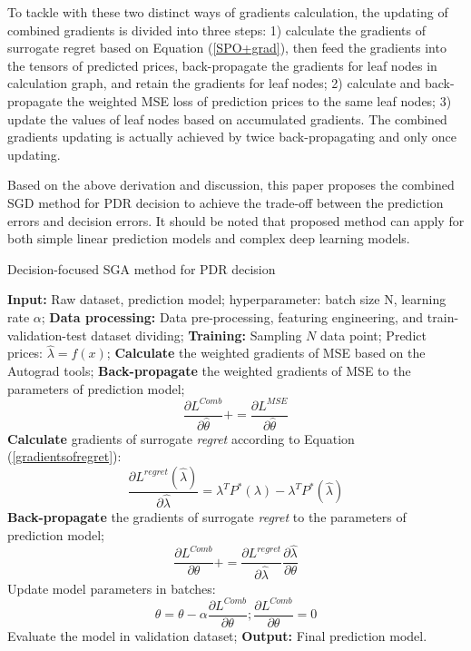 \documentclass[journal]{IEEEtran}
\begin{document}
To tackle with these two distinct ways of gradients calculation, the updating of combined gradients is divided into three steps: 1) calculate the gradients of surrogate regret based on Equation (\ref{SPO+grad}), then feed the gradients into the tensors of predicted prices, back-propagate the gradients for leaf nodes in calculation graph, and retain the gradients for leaf nodes; 2) calculate and back-propagate the weighted MSE loss of prediction prices to the same leaf nodes; 3) update the values of leaf nodes based on accumulated gradients. The combined gradients updating is actually achieved by twice back-propagating and only once updating.

Based on the above derivation and discussion, this paper proposes the combined SGD method for PDR decision to achieve the trade-off between the prediction errors and decision errors. It should be noted that proposed method can apply for both simple linear prediction models and complex deep learning models.

\begin{algorithm}[!t]
  \label{CombSGD}
  \caption{Decision-focused SGA method for PDR decision}
  {\small{
    \begin{algorithmic}[1]
      \STATE \textbf{Input:} Raw dataset, prediction model; hyperparameter: batch size N, learning rate $\alpha$;
      \STATE \textbf{Data processing:} Data pre-processing, featuring engineering, and train-validation-test dataset dividing; 
      \STATE \textbf{Training:}
      \STATE Sampling $N$ data point; 
      \STATE Predict prices: $\hat{\lambda} = f(x)$;
      \STATE \textbf{Calculate} the weighted gradients of MSE based on the Autograd tools;
      \STATE \textbf{Back-propagate} the weighted gradients of MSE to the parameters of prediction model; $$\frac{\partial L^{Comb}}{\partial \hat{\theta}} += \frac{\partial L^{MSE}}{\partial \hat{\theta}}$$
      \STATE \textbf{Calculate} gradients of surrogate \textit{regret} according to Equation (\ref{gradientsofregret}): $$\frac{\partial L^{regret}(\hat{\lambda}) }{\partial \hat{\lambda}} =  \lambda^T P^*(\lambda) - \lambda^T P^*(\hat{\lambda})$$
      \STATE \textbf{Back-propagate} the gradients of surrogate \textit{regret} to the parameters of prediction model;$$\frac{\partial L^{Comb}}{\partial \theta} += \frac{\partial L^{regret}}{\partial \hat{\lambda}} \frac{\partial \hat{\lambda}}{\partial \theta}$$
      \ENDFOR
      \STATE Update model parameters in batches: $$\theta = \theta - \alpha \frac{\partial L^{Comb}}{\partial \theta}; \frac{\partial L^{Comb}}{\partial \theta} = 0$$
      \STATE Evaluate the model in validation dataset;
      \ENDWHILE 
      \STATE \textbf{Output:} Final prediction model.
    \end{algorithmic}
  }}
\end{algorithm}
\end{document}
